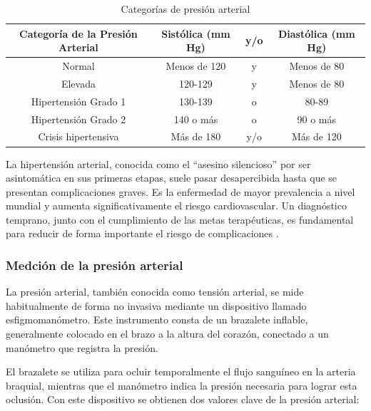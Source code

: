     \begin{table}[H]
        \begin{center}
            \begin{tabularx}{\columnwidth}{>{\raggedright\arraybackslash}c | c | c | c}
                \textbf{Categoría de la Presión Arterial} & \textbf{Sistólica (mm Hg)} & \textbf{y/o} & \textbf{Diastólica (mm Hg)}\\ \hline
                Normal & Menos de 120 & y & Menos de 80 \\
                Elevada & 120-129 & y & Menos de 80 \\
                Hipertensión Grado 1 & 130-139 & o & 80-89 \\
                Hipertensión Grado 2 & 140 o más & o & 90 o más \\
                Crisis hipertensiva & Más de 180 & y/o & Más de 120 \\
            \end{tabularx}
            \caption{Categorías de presión arterial}
            \label{tab:PA_categoria}
        \end{center}
    \end{table}

    La hipertensión arterial, conocida como el ``asesino silencioso'' por ser asintomática en sus primeras etapas, suele pasar desapercibida hasta que se presentan complicaciones graves. Es la enfermedad de mayor prevalencia a nivel mundial y aumenta significativamente el riesgo cardiovascular. Un diagnóstico temprano, junto con el cumplimiento de las metas terapéuticas, es fundamental para reducir de forma importante el riesgo de complicaciones \cite{archivosCardiologia_2016}.

        \subsubsection{Medción de la presión arterial}
        La presión arterial, también conocida como tensión arterial, se mide habitualmente de forma no invasiva mediante un dispositivo llamado esfigmomanómetro. Este instrumento consta de un brazalete inflable, generalmente colocado en el brazo a la altura del corazón, conectado a un manómetro que registra la presión.

        El brazalete se utiliza para ocluir temporalmente el flujo sanguíneo en la arteria braquial, mientras que el manómetro indica la presión necesaria para lograr esta oclusión. Con este dispositivo se obtienen dos valores clave de la presión arterial:

